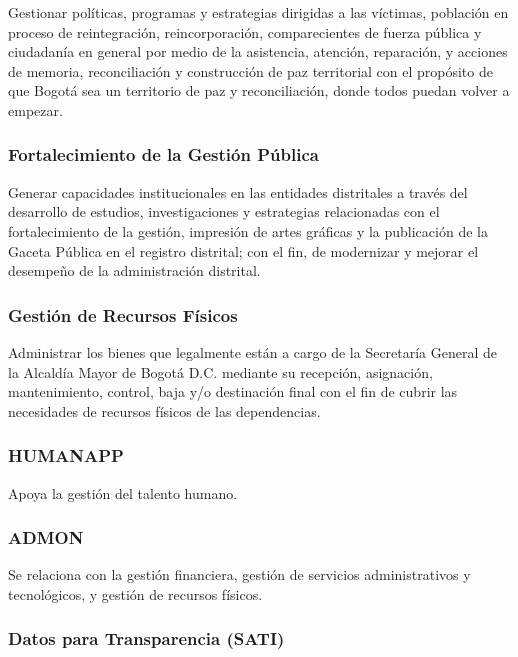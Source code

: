 \documentclass[
	a4paper, %
	12pt, %
]{include/CSSullivanBusinessReport}
\begin{document}
Gestionar políticas, programas y estrategias dirigidas a las víctimas,
población en proceso de reintegración, reincorporación, comparecientes
de fuerza pública y ciudadanía en general por medio de la asistencia,
atención, reparación, y acciones de memoria, reconciliación y
construcción de paz territorial con el propósito de que Bogotá sea un
territorio de paz y reconciliación, donde todos puedan volver a empezar.

\subsubsection{Fortalecimiento de la Gestión
Pública}\label{sec:fortalecimiento-de-la-gestiuxf3n-puxfablica}

Generar capacidades institucionales en las entidades distritales a
través del desarrollo de estudios, investigaciones y estrategias
relacionadas con el fortalecimiento de la gestión, impresión de artes
gráficas y la publicación de la Gaceta Pública en el registro distrital;
con el fin, de modernizar y mejorar el desempeño de la administración
distrital.

\subsubsection{Gestión de Recursos
Físicos}\label{sec:gestiuxf3n-de-recursos-fuxedsicos}

Administrar los bienes que legalmente están a cargo de la Secretaría
General de la Alcaldía Mayor de Bogotá D.C. mediante su recepción,
asignación, mantenimiento, control, baja y/o destinación final con el
fin de cubrir las necesidades de recursos físicos de las dependencias.

\subsubsection{HUMANAPP}\label{sec:humanapp}

Apoya la gestión del talento humano.

\subsubsection{ADMON}\label{sec:admon}

Se relaciona con la gestión financiera, gestión de servicios
administrativos y tecnológicos, y gestión de recursos físicos.

\subsubsection{Datos para Transparencia
(SATI)}\label{sec:datos-para-transparencia-sati}
\end{document}
